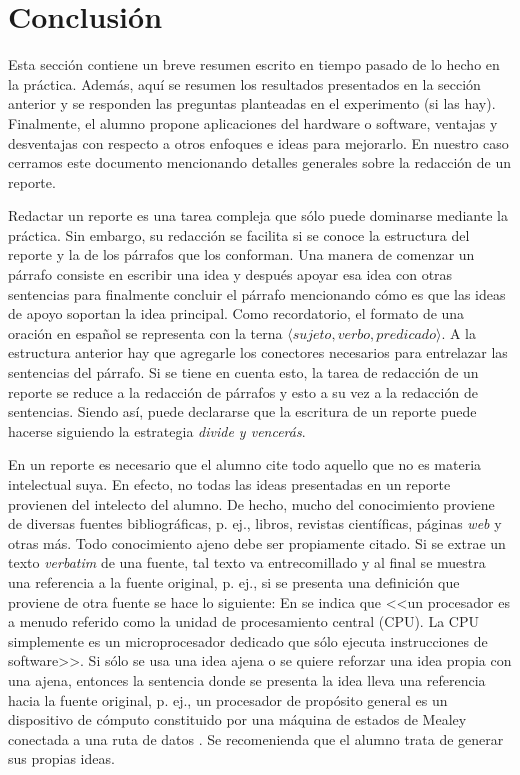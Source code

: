 \documentclass[11pt, twocolumn]{article}
\begin{document}
\section{Conclusión}\label{sec:conclusion}

Esta sección contiene un breve resumen escrito en tiempo pasado de lo hecho en la práctica. Además, aquí se resumen los resultados presentados en la sección anterior y se responden las preguntas planteadas en el experimento (si las hay). Finalmente, el alumno propone aplicaciones del hardware o software, ventajas y desventajas con respecto a otros enfoques e ideas para mejorarlo. En nuestro caso cerramos este documento mencionando detalles generales sobre la redacción de un reporte.

Redactar un reporte es una tarea compleja que sólo puede dominarse mediante la práctica. Sin embargo, su redacción se facilita si se conoce la estructura del reporte y la de los párrafos que los conforman. Una manera de comenzar un párrafo consiste en escribir una idea y después apoyar esa idea con otras sentencias para finalmente concluir el párrafo mencionando cómo es que las ideas de apoyo soportan la idea principal. Como recordatorio, el formato de una oración en español se representa con la terna $\langle sujeto,verbo,predicado \rangle$. A la estructura anterior hay que agregarle los conectores necesarios para entrelazar las sentencias del párrafo. Si se tiene en cuenta esto, la tarea de redacción de un reporte se reduce a la redacción de párrafos y esto a su vez a la redacción de sentencias. Siendo así, puede declararse que la escritura de un reporte puede hacerse siguiendo la estrategia \textit{divide y vencerás}.

En un reporte es necesario que el alumno cite todo aquello que no es materia intelectual suya. En efecto, no todas las ideas presentadas en un reporte provienen del intelecto del alumno. De hecho, mucho del conocimiento proviene de diversas fuentes bibliográficas, p. ej., libros, revistas científicas, páginas \textit{web} y otras más. Todo conocimiento ajeno debe ser propiamente citado. Si se extrae un texto \textit{verbatim} de una fuente, tal texto va entrecomillado y al final se muestra una referencia a la fuente original, p. ej., si se presenta una definición que proviene de otra fuente se hace lo siguiente: En \cite{HwEn05} se indica que <<un procesador es a menudo referido como la unidad de procesamiento central (CPU). La CPU simplemente es un microprocesador dedicado que sólo ejecuta instrucciones de software>>. Si sólo se usa una idea ajena o se quiere reforzar una idea propia con una ajena, entonces la sentencia donde se presenta la idea lleva una referencia hacia la fuente original, p. ej., un procesador de propósito general es un dispositivo de cómputo constituido por una máquina de estados de Mealey conectada a una ruta de datos \cite{HwEn05,MuMi07,StWi13}. Se recomenienda que el alumno trata de generar sus propias ideas.
\end{document}
